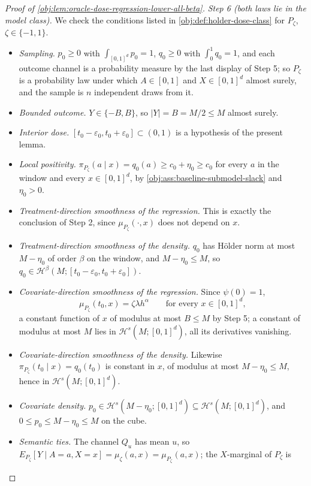 \begin{proof}[Proof of \cref{obj:lem:oracle-dose-regression-lower-all-beta}]
\emph{Step 6 (both laws lie in the model class).} We check the conditions listed in
\cref{obj:def:holder-dose-class} for \(P_\zeta\), \(\zeta\in\{-1,1\}\).
\begin{itemize}
\item \emph{Sampling.} \(p_0\ge0\) with \(\int_{[0,1]^d}p_0=1\), \(q_0\ge0\) with
\(\int_0^1q_0=1\), and each outcome channel is a probability measure by the last display of Step 5;
so \(P_\zeta\) is a probability law under which \(A\in[0,1]\) and \(X\in[0,1]^d\) almost surely, and
the sample is \(n\) independent draws from it.
\item \emph{Bounded outcome.} \(Y\in\{-B,B\}\), so \(|Y|=B=M/2\le M\) almost surely.
\item \emph{Interior dose.} \([t_0-\varepsilon_0,t_0+\varepsilon_0]\subset(0,1)\) is a hypothesis of
the present lemma.
\item \emph{Local positivity.} \(\pi_{P_\zeta}(a\mid x)=q_0(a)\ge c_0+\eta_0\ge c_0\) for every
\(a\) in the window and every \(x\in[0,1]^d\), by \cref{obj:ass:baseline-submodel-slack} and
\(\eta_0>0\).
\item \emph{Treatment-direction smoothness of the regression.} This is exactly the conclusion of
Step 2, since \(\mu_{P_\zeta}(\cdot,x)\) does not depend on \(x\).
\item \emph{Treatment-direction smoothness of the density.} \(q_0\) has Hölder norm at most
\(M-\eta_0\) of order \(\beta\) on the window, and \(M-\eta_0\le M\), so
\(q_0\in\mathcal H^{\beta}(M;[t_0-\varepsilon_0,t_0+\varepsilon_0])\).
\item \emph{Covariate-direction smoothness of the regression.} Since \(\psi(0)=1\),
\[
\mu_{P_\zeta}(t_0,x)=\zeta\lambda h^{\alpha}
\qquad\text{for every }x\in[0,1]^d ,
\]
a constant function of \(x\) of modulus at most \(B\le M\) by Step 5; a constant of modulus at most
\(M\) lies in \(\mathcal H^{s}(M;[0,1]^d)\), all its derivatives vanishing.
\item \emph{Covariate-direction smoothness of the density.} Likewise
\(\pi_{P_\zeta}(t_0\mid x)=q_0(t_0)\) is constant in \(x\), of modulus at most \(M-\eta_0\le M\),
hence in \(\mathcal H^{s}(M;[0,1]^d)\).
\item \emph{Covariate density.} \(p_0\in\mathcal H^{s}(M-\eta_0;[0,1]^d)\subseteq
\mathcal H^{s}(M;[0,1]^d)\), and \(0\le p_0\le M-\eta_0\le M\) on the cube.
\item \emph{Semantic ties.} The channel \(Q_u\) has mean \(u\), so
\(E_{P_\zeta}[Y\mid A=a,X=x]=\mu_\zeta(a,x)=\mu_{P_\zeta}(a,x)\); the \(X\)-marginal of \(P_\zeta\) is

\end{itemize}
\end{proof}
